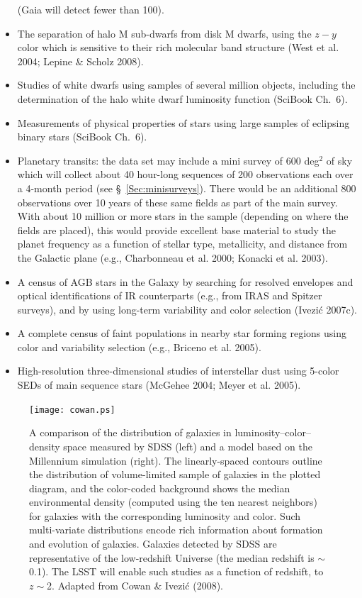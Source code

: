 \documentclass{emulateapj}
\newcommand{\B}[1]{{#1}}
\begin{document}
\begin{itemize}
      (Gaia will detect fewer than 100). 
\item The separation of halo M sub-dwarfs from disk M dwarfs, using 
      the $z-y$ color which is sensitive to their rich molecular band structure
      (West et al. 2004; Lepine \& Scholz 2008).
\item \B{Studies of white dwarfs using samples of several million objects, 
    including the determination of the halo white dwarf luminosity function  
     (SciBook Ch.~6). }
\item \B{Measurements of physical properties of stars using large samples  
        of eclipsing binary stars (SciBook Ch.~6). }
\item Planetary transits: the data set may include a mini survey of 600
      deg$^2$ of sky which will collect about 40 hour-long sequences of 200 
      observations each over a 4-month period (see \S~\ref{Sec:minisurveys}). 
      There would be an additional 800 observations over 10 years of these
      same fields as part of the main survey. With about 10 million or more stars 
      in the sample (depending on where the fields are placed), this would
      provide excellent base material to study the planet frequency as a
      function of stellar type, metallicity, and distance from the Galactic plane
      (e.g., Charbonneau et al. 2000; Konacki et al. 2003).
\item A census of AGB stars in the Galaxy by searching for 
      resolved envelopes and optical identifications of IR counterparts (e.g., from 
      IRAS and Spitzer surveys), and by using long-term variability and color 
      selection (Ivezi\'{c} 2007c).
\item A complete census of faint populations in nearby star forming regions using 
      color and variability selection (e.g., Briceno et al. 2005). 
\item High-resolution three-dimensional studies of interstellar dust using 5-color 
      SEDs of main sequence stars (McGehee 2004; Meyer et al. 2005). 
\end{itemize} 

\begin{figure}
\texttt{[image: cowan.ps]}
\caption{A comparison of the distribution of galaxies in  
luminosity--color--density space measured by SDSS (left) and a model based
on the Millennium simulation (right). The linearly-spaced contours outline
the distribution of volume-limited sample of galaxies in the plotted diagram, and
the color-coded background shows the median environmental density (computed
using the ten nearest neighbors) for galaxies
with the corresponding luminosity and color. Such multi-variate distributions
encode rich information about formation and evolution of galaxies. Galaxies 
detected by SDSS are representative of the low-redshift Universe (the median 
redshift is $\sim$0.1). The LSST will enable such studies as a function of 
redshift, to $z\sim$2. Adapted from Cowan \& Ivezi\'{c} 
(2008).} 
\label{Fig:cowan}
\end{figure}
\end{document}
